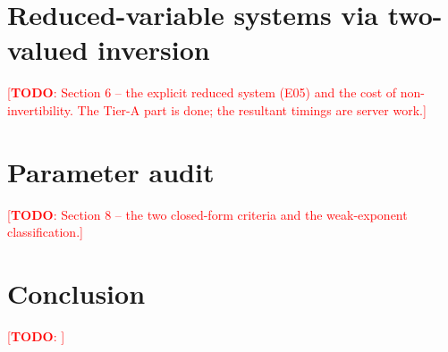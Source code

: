 \documentclass[11pt]{article}
\newcommand{\todo}[1]{\textcolor{red}{[\textbf{TODO}: #1]}}
\theoremstyle{plain}
\theoremstyle{definition}
\begin{document}
\section{Reduced-variable systems via two-valued inversion}\label{sec:reduced}
\todo{Section 6 -- the explicit reduced system (E05) and the cost of non-invertibility.
The Tier-A part is done; the resultant timings are server work.}

\section{Parameter audit}\label{sec:audit}
\todo{Section 8 -- the two closed-form criteria and the weak-exponent classification.}

\section{Conclusion}\label{sec:conclusion}
\todo{}



\end{document}
